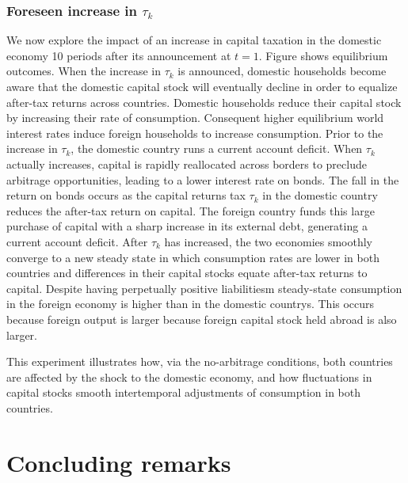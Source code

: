 \subsubsection{Foreseen increase in $\tau_k$}
We now explore the impact of an increase in capital taxation in the domestic
economy 10 periods after its announcement at $t=1$. Figure  shows equilibrium outcomes. When the increase
in $\tau_k$ is announced,
domestic households become aware that the domestic capital stock will eventually
decline in order to  equalize  after-tax
returns across countries. %
Domestic households  reduce their
capital stock by increasing their rate of consumption. Consequent higher equilibrium
world interest rates  induce
foreign households to increase consumption. Prior to the  increase in $\tau_k$, the domestic country runs
a current account deficit. When $\tau_k$ actually  increases,  
 capital is rapidly reallocated across borders to
preclude arbitrage opportunities, leading to a lower interest rate on bonds. The fall in
the return on bonds occurs as  the capital returns tax $\tau_k$ in the domestic country 
reduces the after-tax return on capital. %
The foreign country  funds this large purchase of
capital with a sharp increase in its  external debt, generating  a current account deficit.
After $\tau_k$ has increased, the two economies smoothly converge to a
new steady state in which  consumption rates are lower in both countries and  differences in their  capital stocks equate after-tax returns to capital.  Despite
 having  perpetually positive liabilitiesm   steady-state consumption in the foreign economy is higher than in the domestic countrys. This occurs because foreign output is larger because foreign  capital stock held abroad is also larger.

This experiment illustrates how, via the no-arbitrage conditions,  both   countries are affected by the shock to the domestic economy, 
 and how  fluctuations in capital stocks  smooth intertemporal  adjustments  of  consumption in both countries.


\section{Concluding remarks}

